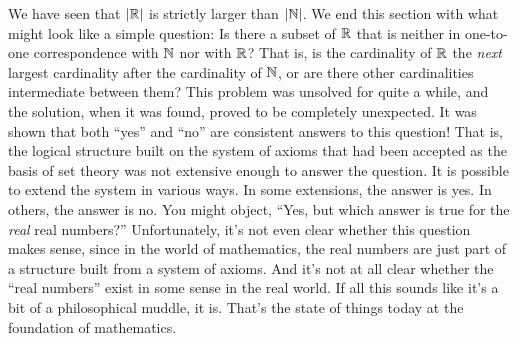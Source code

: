 We have seen that $|{\mathbb R}|$ is strictly larger than $|{\mathbb N}|$.
We end this section with what might look like
a simple question:  Is there a subset of ${\mathbb R}$ that is neither in
one-to-one correspondence with ${\mathbb N}$ nor with ${\mathbb R}$?  That is, is
the cardinality of ${\mathbb R}$ the \emph{next} largest cardinality after
the cardinality of ${\mathbb N}$, or are there other cardinalities intermediate
between them?  This problem was unsolved for quite a while, and
the solution, when it was found, proved to be completely unexpected.  
It was shown that both ``yes'' and
``no'' are consistent answers to this question!  That is, the
logical structure built on the system of axioms that had been
accepted as the basis of set theory was not extensive enough to
answer the question.  It is possible to extend the system in
various ways.  In some extensions, the answer is yes.  In others,
the answer is no.  You might object, ``Yes, but which answer is
true for the \emph{real} real numbers?''  Unfortunately, it's 
not even clear whether this question makes sense, since
in the world of mathematics, the real numbers are just part of
a structure built from a system of axioms.  And it's not at
all clear whether the ``real numbers'' exist in some sense in the real world.
If all this sounds like it's a bit of a philosophical muddle,
it is.  That's the state of things today at the foundation of
mathematics.

